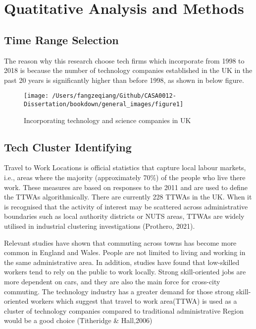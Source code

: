 \documentclass[
  12pt,
  oneside]{book}
\begin{document}
\hypertarget{quatitative-analysis-and-methods}{%
\section{Quatitative Analysis and Methods}\label{quatitative-analysis-and-methods}}

\hypertarget{time-range-selection}{%
\subsection{Time Range Selection}\label{time-range-selection}}

The reason why this research choose tech firms which incorporate from 1998 to 2018 is because the number of technology companies established in the UK in the past 20 years is significantly higher than before 1998, as shown in below figure.

\begin{figure}
\texttt{[image: /Users/fangzeqiang/Github/CASA0012-Dissertation/bookdown/general\_images/figure1]} \caption{Incorporating technology and science companies in UK}\label{fig:fig-1}
\end{figure}

\hypertarget{tech-cluster-identifying}{%
\subsection{Tech Cluster Identifying}\label{tech-cluster-identifying}}

Travel to Work Locations is official statistics that capture local labour markets, i.e., areas where the majority (approximately 70\%) of the people who live there work. These measures are based on responses to the 2011 and are used to define the TTWAs algorithmically. There are currently 228 TTWAs in the UK. When it is recognised that the activity of interest may be scattered across administrative boundaries such as local authority districts or NUTS areas, TTWAs are widely utilised in industrial clustering investigations (Prothero, 2021).

Relevant studies have shown that commuting across towns has become more common in England and Wales. People are not limited to living and working in the same administrative area. In addition, studies have found that low-skilled workers tend to rely on the public to work locally. Strong skill-oriented jobs are more dependent on cars, and they are also the main force for cross-city commuting. The technology industry has a greater demand for those strong skill-oriented workers which suggest that travel to work area(TTWA) is used as a cluster of technology companies compared to traditional administrative Region would be a good choice (Titheridge \& Hall,2006)
\end{document}
